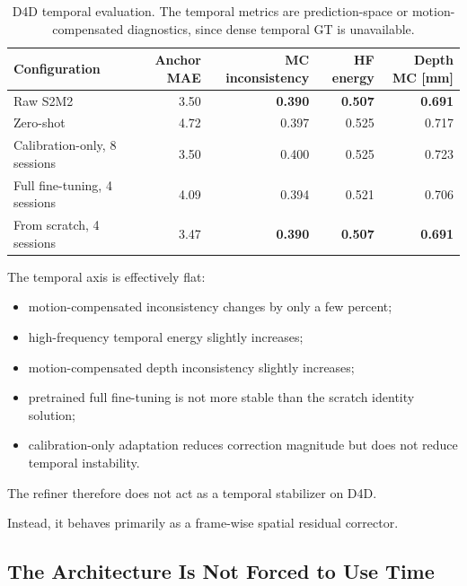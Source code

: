 \documentclass[11pt,a4paper]{article}
\begin{document}
\begin{table}[h]
\centering
\caption{D4D temporal evaluation. The temporal metrics are prediction-space or
motion-compensated diagnostics, since dense temporal GT is unavailable.}
\small
\begin{tabular}{lrrrr}
\toprule
\textbf{Configuration}
& \textbf{Anchor MAE}
& \textbf{MC inconsistency}
& \textbf{HF energy}
& \textbf{Depth MC [mm]} \\
\midrule
Raw S2M2
& 3.50
& \textbf{0.390}
& \textbf{0.507}
& \textbf{0.691} \\

Zero-shot
& 4.72
& 0.397
& 0.525
& 0.717 \\

Calibration-only, 8 sessions
& 3.50
& 0.400
& 0.525
& 0.723 \\

Full fine-tuning, 4 sessions
& 4.09
& 0.394
& 0.521
& 0.706 \\

From scratch, 4 sessions
& 3.47
& \textbf{0.390}
& \textbf{0.507}
& \textbf{0.691} \\
\bottomrule
\end{tabular}
\end{table}

The temporal axis is effectively flat:

\begin{itemize}[leftmargin=*]
    \item motion-compensated inconsistency changes by only a few percent;
    \item high-frequency temporal energy slightly increases;
    \item motion-compensated depth inconsistency slightly increases;
    \item pretrained full fine-tuning is not more stable than the scratch identity
    solution;
    \item calibration-only adaptation reduces correction magnitude but does not
    reduce temporal instability.
\end{itemize}

The refiner therefore does not act as a temporal stabilizer on D4D.

Instead, it behaves primarily as a frame-wise spatial residual corrector.

\subsection{The Architecture Is Not Forced to Use Time}
\end{document}
